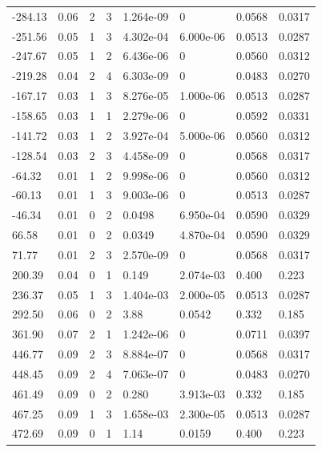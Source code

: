 \documentclass[preview]{standalone}
\begin{document}
{{\begin{tabular}{L{1.2cm}C{1.2cm} C{0.3cm}C{0.5cm} C{1.4cm}C{1.4cm} C{1.4cm}C{1.4cm}}
  -284.13  &  0.06  & 2     &  3 &  1.264e-09  & 0  & 0.0568 &  0.0317   \\ 
  -251.56  &  0.05  & 1     &  3 &  4.302e-04  & 6.000e-06  & 0.0513 &  0.0287   \\ 
  -247.67  &  0.05  & 1     &  2 &  6.436e-06  & 0  & 0.0560 &  0.0312   \\ 
  -219.28  &  0.04  & 2     &  4 &  6.303e-09  & 0  & 0.0483 &  0.0270   \\ 
  -167.17  &  0.03  & 1     &  3 &  8.276e-05  & 1.000e-06  & 0.0513 &  0.0287   \\ 
  -158.65  &  0.03  & 1     &  1 &  2.279e-06  & 0  & 0.0592 &  0.0331   \\ 
  -141.72  &  0.03  & 1     &  2 &  3.927e-04  & 5.000e-06  & 0.0560 &  0.0312   \\ 
  -128.54  &  0.03  & 2     &  3 &  4.458e-09  & 0  & 0.0568 &  0.0317   \\ 
  -64.32  &  0.01  & 1     &  2 &  9.998e-06  & 0  & 0.0560 &  0.0312   \\ 
  -60.13  &  0.01  & 1     &  3 &  9.003e-06  & 0  & 0.0513 &  0.0287   \\ 
  -46.34  &  0.01  & 0     &  2 &  0.0498  & 6.950e-04  & 0.0590 &  0.0329   \\ 
  66.58  &  0.01  & 0     &  2 &  0.0349  & 4.870e-04  & 0.0590 &  0.0329   \\ 
  71.77  &  0.01  & 2     &  3 &  2.570e-09  & 0  & 0.0568 &  0.0317   \\ 
  200.39  &  0.04  & 0     &  1 &  0.149  & 2.074e-03  & 0.400 &  0.223   \\ 
  236.37  &  0.05  & 1     &  3 &  1.404e-03  & 2.000e-05  & 0.0513 &  0.0287   \\ 
  292.50  &  0.06  & 0     &  2 &  3.88  & 0.0542  & 0.332 &  0.185   \\ 
  361.90  &  0.07  & 2     &  1 &  1.242e-06  & 0  & 0.0711 &  0.0397   \\ 
  446.77  &  0.09  & 2     &  3 &  8.884e-07  & 0  & 0.0568 &  0.0317   \\ 
  448.45  &  0.09  & 2     &  4 &  7.063e-07  & 0  & 0.0483 &  0.0270   \\ 
  461.49  &  0.09  & 0     &  2 &  0.280  & 3.913e-03  & 0.332 &  0.185   \\ 
  467.25  &  0.09  & 1     &  3 &  1.658e-03  & 2.300e-05  & 0.0513 &  0.0287   \\ 
  472.69  &  0.09  & 0     &  1 &  1.14  & 0.0159  & 0.400 &  0.223   \\ 

\end{tabular}}}
\end{document}
